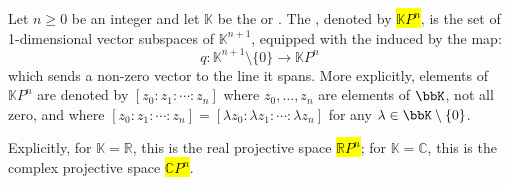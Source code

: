 \begin{definition} \label{definition:real_or_complex_projective_space}
Let $n \ge 0$ be an integer and let $\mathbb{K}$ be the  or . The , denoted by \hl{$\mathbb{K}P^n$}, is the set of 1-dimensional vector subspaces of $\mathbb{K}^{n+1}$, equipped with the  induced by the map:
$$q: \mathbb{K}^{n+1} \setminus \{0\} \to \mathbb{K}P^n$$
which sends a non-zero vector to the line it spans. More explicitly, elements of $\mathbb{K}P^n$ are denoted by $[z_0:z_1:\cdots:z_n]$ where $z_0,\ldots,z_n$ are elements of $\bbK$, not all zero, and where $[z_0:z_1:\cdots:z_n] = [\lambda z_0: \lambda z_1:\cdots: \lambda z_n]$ for any $\lambda \in \bbK \setminus \{0\}$.

Explicitly, for $\mathbb{K} = \mathbb{R}$, this is the real projective space \hl{$\mathbb{R}P^n$}; for $\mathbb{K} = \mathbb{C}$, this is the complex projective space \hl{$\mathbb{C}P^n$}.
\end{definition}